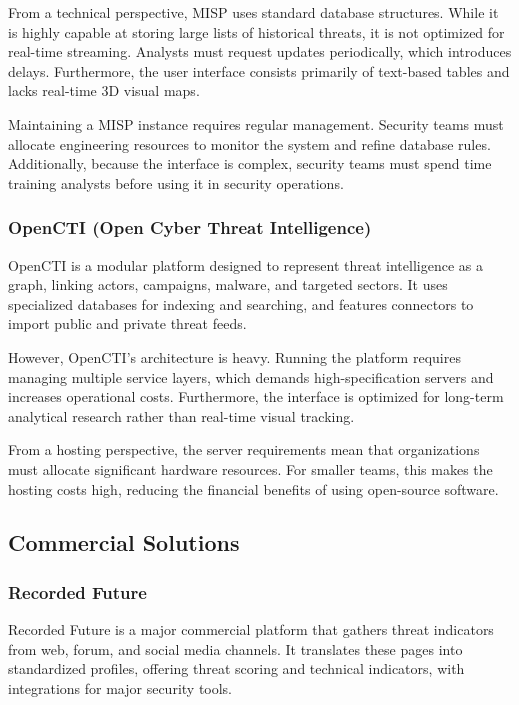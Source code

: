 From a technical perspective, MISP uses standard database structures. While it is highly capable at storing large lists of historical threats, it is not optimized for real-time streaming. Analysts must request updates periodically, which introduces delays. Furthermore, the user interface consists primarily of text-based tables and lacks real-time 3D visual maps.

Maintaining a MISP instance requires regular management. Security teams must allocate engineering resources to monitor the system and refine database rules. Additionally, because the interface is complex, security teams must spend time training analysts before using it in security operations.

\subsubsection{OpenCTI (Open Cyber Threat Intelligence)}
OpenCTI is a modular platform designed to represent threat intelligence as a graph, linking actors, campaigns, malware, and targeted sectors. It uses specialized databases for indexing and searching, and features connectors to import public and private threat feeds.

However, OpenCTI's architecture is heavy. Running the platform requires managing multiple service layers, which demands high-specification servers and increases operational costs. Furthermore, the interface is optimized for long-term analytical research rather than real-time visual tracking.

From a hosting perspective, the server requirements mean that organizations must allocate significant hardware resources. For smaller teams, this makes the hosting costs high, reducing the financial benefits of using open-source software.

\subsection{Commercial Solutions}

\subsubsection{Recorded Future}
Recorded Future is a major commercial platform that gathers threat indicators from web, forum, and social media channels. It translates these pages into standardized profiles, offering threat scoring and technical indicators, with integrations for major security tools.

